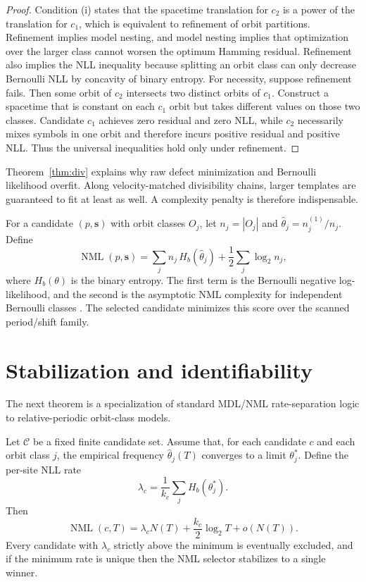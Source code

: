 \documentclass[10pt,twoside]{article}
\newcommand{\bs}{\mathbf{s}}
\newcommand{\NML}{\operatorname{NML}}
\newcommand{\Hb}{H_b}
\begin{document}
\begin{proof}
Condition (i) states that the spacetime translation for $c_2$ is a power of the translation for $c_1$, which is equivalent to refinement of orbit partitions. Refinement implies model nesting, and model nesting implies that optimization over the larger class cannot worsen the optimum Hamming residual. Refinement also implies the NLL inequality because splitting an orbit class can only decrease Bernoulli NLL by concavity of binary entropy. For necessity, suppose refinement fails. Then some orbit of $c_2$ intersects two distinct orbits of $c_1$. Construct a spacetime that is constant on each $c_1$ orbit but takes different values on those two classes. Candidate $c_1$ achieves zero residual and zero NLL, while $c_2$ necessarily mixes symbols in one orbit and therefore incurs positive residual and positive NLL. Thus the universal inequalities hold only under refinement.
\end{proof}

Theorem~\ref{thm:div} explains why raw defect minimization and Bernoulli likelihood overfit. Along velocity-matched divisibility chains, larger templates are guaranteed to fit at least as well. A complexity penalty is therefore indispensable.

For a candidate $(p,\bs)$ with orbit classes $O_j$, let $n_j = |O_j|$ and $\hat\theta_j = n_j^{(1)}/n_j$. Define
\[
\NML(p,\bs) = \sum_j n_j\,\Hb(\hat\theta_j) + \frac{1}{2}\sum_j \log_2 n_j,
\]
where $\Hb(\theta)$ is the binary entropy. The first term is the Bernoulli negative log-likelihood, and the second is the asymptotic NML complexity for independent Bernoulli classes \cite{grunwald2007,shtarkov1987}. The selected candidate minimizes this score over the scanned period/shift family.

\section{Stabilization and identifiability}

The next theorem is a specialization of standard MDL/NML rate-separation logic to relative-periodic orbit-class models.

\begin{theorem}\label{thm:stab}
Let $\mathcal{C}$ be a fixed finite candidate set. Assume that, for each candidate $c$ and each orbit class $j$, the empirical frequency $\hat\theta_j(T)$ converges to a limit $\theta_j^*$. Define the per-site NLL rate
\[
\lambda_c = \frac{1}{k_c}\sum_j \Hb(\theta_j^*).
\]
Then
\[
\NML(c,T)=\lambda_c N(T)+\frac{k_c}{2}\log_2 T + o(N(T)).
\]
Every candidate with $\lambda_c$ strictly above the minimum is eventually excluded, and if the minimum rate is unique then the NML selector stabilizes to a single winner.
\end{theorem}
\end{document}
